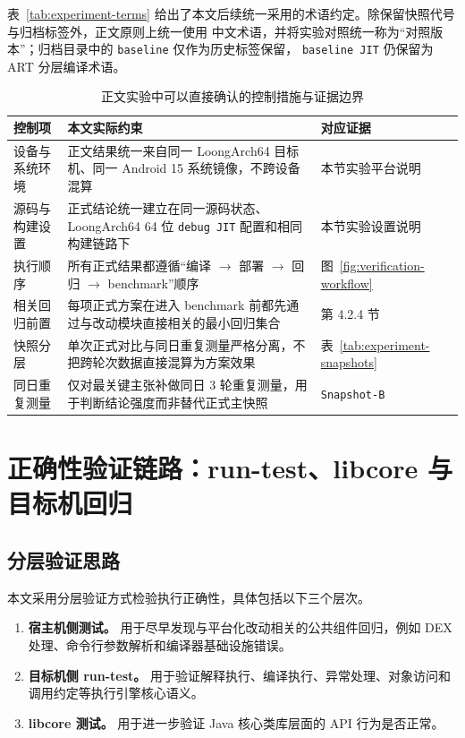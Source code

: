 表~\ref{tab:experiment-terms} 给出了本文后续统一采用的术语约定。除保留快照代号与归档标签外，正文原则上统一使用
中文术语，并将实验对照统一称为“对照版本”；归档目录中的 \texttt{baseline} 仅作为历史标签保留，
\texttt{baseline JIT} 仍保留为 ART 分层编译术语。

\begin{table}[htbp]
    \centering
    \small
    \caption{正文实验中可以直接确认的控制措施与证据边界}
    \label{tab:experiment-control-measures}
    \begin{tabular}{>{\raggedright\arraybackslash}p{2.6cm}>{\raggedright\arraybackslash}p{5.2cm}>{\raggedright\arraybackslash}p{3.2cm}}
        \hline
        \textbf{控制项} & \textbf{本文实际约束} & \textbf{对应证据} \\
        \hline
        设备与系统环境 & 正文结果统一来自同一 LoongArch64 目标机、同一 Android 15 系统镜像，不跨设备混算 & 本节实验平台说明 \\
        源码与构建设置 & 正式结论统一建立在同一源码状态、LoongArch64 64 位 \texttt{debug JIT} 配置和相同构建链路下 & 本节实验设置说明 \\
        执行顺序 & 所有正式结果都遵循“编译 $\rightarrow$ 部署 $\rightarrow$ 回归 $\rightarrow$ benchmark”顺序 & 图~\ref{fig:verification-workflow} \\
        相关回归前置 & 每项正式方案在进入 benchmark 前都先通过与改动模块直接相关的最小回归集合 & 第 4.2.4 节 \\
        快照分层 & 单次正式对比与同日重复测量严格分离，不把跨轮次数据直接混算为方案效果 & 表~\ref{tab:experiment-snapshots} \\
        同日重复测量 & 仅对最关键主张补做同日 3 轮重复测量，用于判断结论强度而非替代正式主快照 & \texttt{Snapshot-B} \\
        \hline
    \end{tabular}
\end{table}

\section{正确性验证链路：run-test、libcore 与目标机回归}

\subsection{分层验证思路}

本文采用分层验证方式检验执行正确性，具体包括以下三个层次。
\begin{enumerate}
    \item \textbf{宿主机侧测试。} 用于尽早发现与平台化改动相关的公共组件回归，例如 DEX 处理、命令行参数解析和编译器基础设施错误。
    \item \textbf{目标机侧 run-test。} 用于验证解释执行、编译执行、异常处理、对象访问和调用约定等执行引擎核心语义。
    \item \textbf{libcore 测试。} 用于进一步验证 Java 核心类库层面的 API 行为是否正常。
\end{enumerate}

